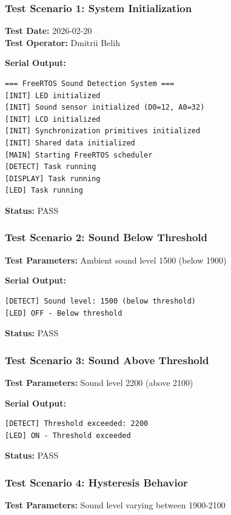 \documentclass[12pt]{article}
\begin{document}
\subsubsection*{Test Scenario 1: System Initialization}

\textbf{Test Date:} 2026-02-20 \\
\textbf{Test Operator:} Dmitrii Belih

\textbf{Serial Output:}
\begin{verbatim}
=== FreeRTOS Sound Detection System ===
[INIT] LED initialized
[INIT] Sound sensor initialized (D0=12, A0=32)
[INIT] LCD initialized
[INIT] Synchronization primitives initialized
[INIT] Shared data initialized
[MAIN] Starting FreeRTOS scheduler
[DETECT] Task running
[DISPLAY] Task running
[LED] Task running
\end{verbatim}

\textbf{Status:} PASS

\subsubsection*{Test Scenario 2: Sound Below Threshold}

\textbf{Test Parameters:} Ambient sound level 1500 (below 1900)

\textbf{Serial Output:}
\begin{verbatim}
[DETECT] Sound level: 1500 (below threshold)
[LED] OFF - Below threshold
\end{verbatim}

\textbf{Status:} PASS

\subsubsection*{Test Scenario 3: Sound Above Threshold}

\textbf{Test Parameters:} Sound level 2200 (above 2100)

\textbf{Serial Output:}
\begin{verbatim}
[DETECT] Threshold exceeded: 2200
[LED] ON - Threshold exceeded
\end{verbatim}

\textbf{Status:} PASS

\subsubsection*{Test Scenario 4: Hysteresis Behavior}

\textbf{Test Parameters:} Sound level varying between 1900-2100
\end{document}
